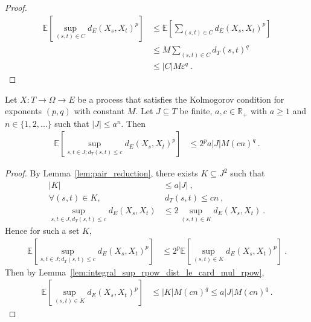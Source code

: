 \begin{proof}
\begin{align*}
  \mathbb{E}\left[\sup_{(s,t) \in C} d_E(X_s, X_t)^p \right]
  &\le \mathbb{E}\left[\sum_{(s,t) \in C} d_E(X_s, X_t)^p \right]
  \\
  &\le M \sum_{(s,t) \in C} d_T(s, t)^q
  \\
  &\le \vert C \vert M \varepsilon^q
  \: .
\end{align*}
\end{proof}


\begin{lemma}\label{lem:integral_sup_rpow_dist_of_dist_le}
  \leanok
Let $X : T \to \Omega \to E$ be a process that satisfies the Kolmogorov condition for exponents $(p,q)$ with constant $M$.
Let $J \subseteq T$ be finite, $a, c \in \mathbb R_+$ with $a \ge 1$ and $n \in \{1, 2, ...\}$ such that $|J| \le a^n$.
Then
\begin{align*}
  \mathbb{E} \left[ \sup_{s, t \in J; d_T(s, t) \le c} d_E(X_s, X_t)^p \right]
  &\le 2^p a |J| M (cn)^q
  \: .
\end{align*}
\end{lemma}

\begin{proof}
By Lemma~\ref{lem:pair_reduction}, there exists $K \subseteq J^2$ such that
\begin{align*}
  |K|
  & \le a |J|
  \:, \\
  \forall (s,t) \in K,
  & \ d_T(s,t) \le c n
  \:, \\
  \sup_{s,t\in J, d_T(s,t) \le c} d_E(X_s, X_t)
  & \le 2 \sup_{(s,t) \in K} d_E(X_s, X_t)
  \: .
\end{align*}
Hence for such a set $K$,
\begin{align*}
  \mathbb{E} \left[ \sup_{s, t \in J; d_T(s, t) \le c} d_E(X_s, X_t)^p \right]
  &\le 2^p \mathbb{E} \left[ \sup_{(s, t) \in K} d_E(X_s, X_t)^p \right]
  \: .
\end{align*}
Then by Lemma~\ref{lem:integral_sup_rpow_dist_le_card_mul_rpow},
\begin{align*}
  \mathbb{E} \left[ \sup_{(s, t) \in K} d_E(X_s, X_t)^p \right]
  &\le |K| M (cn)^q
  \le a |J| M (cn)^q
  \: .
\end{align*}
\end{proof}


